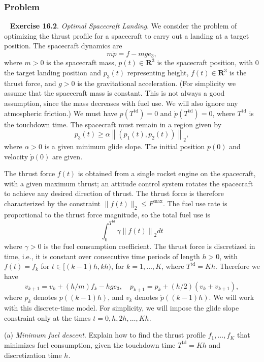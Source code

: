 \documentclass[12pt,reqno]{article}
\theoremstyle{definition}
\numberwithin{equation}{section}
\begin{document}
\subsubsection*{Problem}

\noindent~\cite{EE364a-extra} \textbf{Exercise 16.2}. \textit{Optimal Spacecraft Landing}. 
    We consider the problem of optimizing the thrust profile for a spacecraft
    to carry out a landing at a target position. The spacecraft dynamics are
    \[
    m \ddot{p}=f-m g e_3,
    \]
    where $m>0$ is the spacecraft mass, $p(t) \in \mathbf{R}^3$ is the spacecraft position, with 0 the target landing position and $p_3(t)$ representing height,
    $f(t) \in \mathbf{R}^3$ is the thrust force, and $g>0$ is the gravitational acceleration.
    (For simplicity we assume that the spacecraft mass is constant. This is not always a good assumption, since the mass decreases with fuel use.
    We will also ignore any atmospheric friction.) We must have $p\left(T^{\mathrm{td}}\right)=0$ and $\dot{p}\left(T^{\mathrm{td}}\right)=0$,
    where $T^{\mathrm{td}}$ is the touchdown time. The spacecraft must remain in a region given by
    \[
    p_3(t) \geq \alpha\left\|\left(p_1(t), p_2(t)\right)\right\|_2,
    \]
    where $\alpha>0$ is a given minimum glide slope. The initial position $p(0)$ and velocity $\dot{p}(0)$ are given.

    \noindent The thrust force $f(t)$ is obtained from a single rocket engine on the spacecraft, with a given maximum thrust; an attitude control system rotates the spacecraft to achieve any desired direction of thrust. The thrust force is therefore characterized by the constraint $\|f(t)\|_2 \leq F^{\mathrm{max}}$. The fuel use rate is proportional to the thrust force magnitude, so the total fuel use is
    \[
    \int_0^{T^{td}} \gamma \left\lVert f(t) \right\rVert_{2} dt
    \]
    where $\gamma>0$ is the fuel consumption coefficient. The thrust force is discretized in time, i.e., it is constant over consecutive time periods of length $h>0$, with $f(t)=f_k$ for $t \in[(k-1) h, k h)$, for $k=1, \ldots, K$, where $T^{\mathrm{td}}=K h$. Therefore we have
    \[
    v_{k+1}=v_k+(h / m) f_k-h g e_3, \quad p_{k+1}=p_k+(h / 2)\left(v_k+v_{k+1}\right),
    \]
    where $p_k$ denotes $p((k-1) h)$, and $v_k$ denotes $\dot{p}((k-1) h)$. We will work with this discrete-time model.
    For simplicity, we will impose the glide slope constraint only at the times $t=0, h, 2 h, \ldots, K h$.

    \vspace{0.2cm}
    \noindent(a) \textit{Minimum fuel descent}. Explain how to find the thrust profile $f_1, \ldots, f_K$ that minimizes fuel consumption, given the touchdown time $T^{\mathrm{td}}=K h$ and discretization time $h$. 
    
\end{document}
